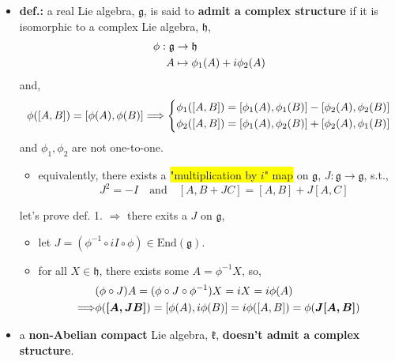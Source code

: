 \begin{itemize}
	\item \textbf{def.:} a real Lie algebra, $\mathfrak{g}$, is said to \textbf{admit a complex structure} if it is isomorphic to a complex Lie algebra, $\mathfrak{h}$,
	\begin{align}
		\phi : \mathfrak{g} & \rightarrow \mathfrak{h} \notag \\
		A & \mapsto \phi_1(A) + i \phi_2(A)
	\end{align}
	and,
	\begin{equation}
		\phi([A, B]) = [\phi(A), \phi(B)] \Longrightarrow \begin{dcases}
			\phi_1([A, B]) = [\phi_1(A), \phi_1(B)] - [\phi_2(A), \phi_2(B)] \\
			\phi_2([A, B]) = [\phi_1(A), \phi_2(B)] + [\phi_2(A), \phi_1(B)]
		\end{dcases}
	\end{equation}
	and $\phi_1, \phi_2$ are not one-to-one.
	\begin{itemize}
		\item equivalently, there exists a \colorbox{yellow}{"multiplication by $i$" map} on $\mathfrak{g}$, $J : \mathfrak{g} \rightarrow \mathfrak{g}$, s.t.,
		\begin{equation}
			\quad J^2 = - I \quad \text{and} \quad [A, B + J C] = [A, B] + J [A, C]
		\end{equation}
	\end{itemize}
	
	\begin{tcolorbox}[title=proof:]
		let's prove def. 1. $\Longrightarrow$ there exits a $J$ on $\mathfrak{g}$,
		\begin{itemize}
			\item let $J = (\phi^{- 1} \circ i I \circ \phi) \in \mathrm{End}(\mathfrak{g})$.
			
			\item for all $X \in \mathfrak{h}$, there exists some $A = \phi^{- 1} X$, so,
			\begin{align}
				& (\phi \circ J) A = (\phi \circ J \circ \phi^{- 1}) X = i X = i \phi(A) \notag \\
				\Longrightarrow & \phi(\boldsymbol{[A, J B]}) = [\phi(A), i \phi(B)] = i \phi([A, B]) = \phi(\boldsymbol{J [A, B]})
			\end{align}
		\end{itemize}
	\end{tcolorbox}
	
	\item a \textbf{non-Abelian compact} Lie algebra, $\mathfrak{k}$, \textbf{doesn't admit a complex structure}.
	

\end{itemize}
